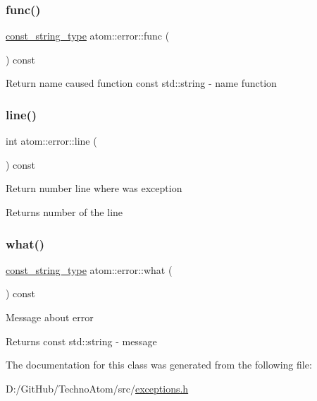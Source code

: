 \subsubsection{\texorpdfstring{func()}{func()}}
{\footnotesize\ttfamily \hyperlink{classatom_1_1error_ac330e9fb7cedcf4a173c5eb156d7bdaf}{const\+\_\+string\+\_\+type} atom\+::error\+::func (\begin{DoxyParamCaption}{ }\end{DoxyParamCaption}) const\hspace{0.3cm}{\ttfamily [inline]}}

Return name caused function  const std\+::string -\/ name function \mbox{\label{classatom_1_1error_aa9443d1a458d0dc6086372444a58e8c6}} 
\subsubsection{\texorpdfstring{line()}{line()}}
{\footnotesize\ttfamily int atom\+::error\+::line (\begin{DoxyParamCaption}{ }\end{DoxyParamCaption}) const\hspace{0.3cm}{\ttfamily [inline]}}

Return number line where was exception \begin{DoxyReturn}{Returns}
number of the line 
\end{DoxyReturn}
\mbox{\label{classatom_1_1error_a126f6c573e37febac3148244389f7736}} 
\subsubsection{\texorpdfstring{what()}{what()}}
{\footnotesize\ttfamily \hyperlink{classatom_1_1error_ac330e9fb7cedcf4a173c5eb156d7bdaf}{const\+\_\+string\+\_\+type} atom\+::error\+::what (\begin{DoxyParamCaption}{ }\end{DoxyParamCaption}) const\hspace{0.3cm}{\ttfamily [inline]}}

Message about error \begin{DoxyReturn}{Returns}
const std\+::string -\/ message 
\end{DoxyReturn}


The documentation for this class was generated from the following file\+:\begin{DoxyCompactItemize}
\item 
D\+:/\+Git\+Hub/\+Techno\+Atom/src/\hyperlink{exceptions_8h}{exceptions.\+h}\end{DoxyCompactItemize}
